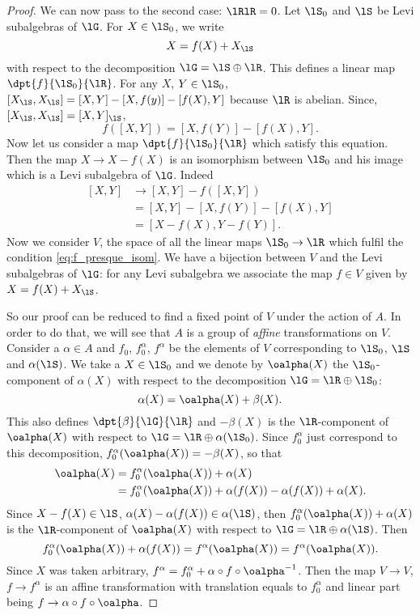 \begin{proof}
	We can now pass to the second case: $\lRlR=0$.
	Let $\lS_0$ and $\lS$ be Levi subalgebras of $\lG$. For $X\in\lS_0$, we write
	\[
		X=f(X)+X_{\lS}
	\]
	with respect to the decomposition $\lG=\lS\oplus\lR$. This defines a linear map $\dpt{f}{\lS_0}{\lR}$. For any $X$, $Y\in\lS_0$, $[X_{\lS},X_{\lS}]=[X,Y]-[X,f(y)]-[f(X),Y]$ because $\lR$ is abelian. Since, $[X_{\lS},X_{\lS}]=[X,Y]_{\lS}$,
	\begin{equation}\label{eq:f_presque_isom}
		f([X,Y])=[X,f(Y)]-[f(X),Y].
	\end{equation}
	Now let us consider a map $\dpt{f}{\lS_0}{\lR}$ which satisfy this equation. Then the map $X\to X-f(X)$ is an isomorphism between $\lS_0$ and his image which is a Levi subalgebra of $\lG$. Indeed
	\begin{equation}
		\begin{split}
			[X,Y]&\to[X,Y]-f([X,Y])\\
			&=[X,Y]-[X,f(Y)]-[f(X),Y]\\
			&=[X-f(X),Y-f(Y)].
		\end{split}
	\end{equation}
	Now we consider $V$, the space of all the linear maps $\lS_0\to\lR$ which fulfil the condition \eqref{eq:f_presque_isom}. We have a bijection between $V$ and the Levi subalgebras of $\lG$: for any Levi subalgebra we associate the map $f\in V$ given by $X=f(X)+X_{\lS}$.

	So our proof can be reduced to find a fixed point of $V$ under the action of $A$. In order to do that, we will see that $A$ is a group of \emph{affine} transformations on $V$. Consider a $\alpha\in A$ and $f_0$, $f_0^{\alpha}$, $f^{\alpha}$ be the elements of $V$ corresponding to $\lS_0$, $\lS$ and $\alpha(\lS)$. We take a $X\in\lS_0$ and we denote by $\oalpha(X)$ the $\lS_0$-component of $\alpha(X)$ with respect to the decomposition $\lG=\lR\oplus\lS_0$:
	\[
		\alpha(X)=\oalpha(X)+\beta(X).
	\]
	This also defines $\dpt{\beta}{\lG}{\lR}$ and $-\beta(X)$ is the $\lR$-component of $\oalpha(X)$ with respect to $\lG=\lR\oplus\alpha(\lS_0)$. Since $f_0^{\alpha}$ just correspond to this decomposition, $f_0^{\alpha}(\oalpha(X))=-\beta(X)$, so that
	\begin{equation}
		\begin{split}
			\oalpha(X)&=f_0^{\alpha}(\oalpha(X))+\alpha(X)\\
			&=f_0^{\alpha}(\oalpha(X))+\alpha(f(X))-\alpha(f(X))+\alpha(X).
		\end{split}
	\end{equation}
	Since $X-f(X)\in\lS$, $\alpha(X)-\alpha(f(X))\in\alpha(\lS)$, then $f_0^{\alpha}(\oalpha(X))+\alpha(X)$ is the $\lR$-component of $\oalpha(X)$ with respect to $\lG=\lR\oplus\alpha(\lS)$. Then
	\[
		f_0^{\alpha}(\oalpha(X))+\alpha(f(X))=f^{\alpha}(\oalpha(X))=f^{\alpha}(\oalpha(X)).
	\]
	Since $X$ was taken arbitrary, $f^{\alpha}=f^{\alpha}_0+\alpha\circ f\circ\oalpha^{-1}$. Then the map $V\to V$, $f\to f^{\alpha}$ is an affine transformation with translation equals to $f_0^{\alpha}$ and linear part being $f\to\alpha\circ f\circ\oalpha$.


\end{proof}
